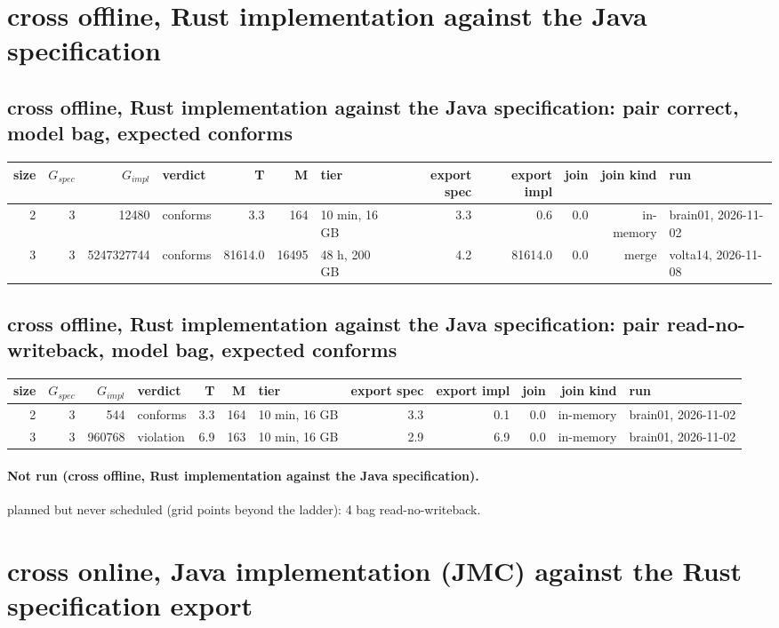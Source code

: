 \documentclass[10pt]{article}
\begin{document}
\section*{cross offline, Rust implementation against the Java specification}
\subsection*{cross offline, Rust implementation against the Java specification: pair \textsf{correct}, model bag, expected conforms}
\begin{longtable}{@{}rrrlrrlrrrrl@{}}
\toprule
size & $G_{\mathit{spec}}$ & $G_{\mathit{impl}}$ & verdict & T & M & tier & export spec & export impl & join & join kind & run \\
\midrule
\endhead
\color{red} 2 & 3 & 12480 & conforms & 3.3 & 164 & 10 min, 16 GB & 3.3 & 0.6 & 0.0 & in-memory & brain01, 2026-11-02 \\
\color{red} 3 & 3 & 5247327744 & conforms & 81614.0 & 16495 & 48 h, 200 GB & 4.2 & 81614.0 & 0.0 & merge & volta14, 2026-11-08 \\
\bottomrule
\end{longtable}
\subsection*{cross offline, Rust implementation against the Java specification: pair \textsf{read-no-writeback}, model bag, expected conforms}
\begin{longtable}{@{}rrrlrrlrrrrl@{}}
\toprule
size & $G_{\mathit{spec}}$ & $G_{\mathit{impl}}$ & verdict & T & M & tier & export spec & export impl & join & join kind & run \\
\midrule
\endhead
\color{red} 2 & 3 & 544 & conforms & 3.3 & 164 & 10 min, 16 GB & 3.3 & 0.1 & 0.0 & in-memory & brain01, 2026-11-02 \\
\color{red} 3 & 3 & 960768 & violation & 6.9 & 163 & 10 min, 16 GB & 2.9 & 6.9 & 0.0 & in-memory & brain01, 2026-11-02 \\
\bottomrule
\end{longtable}
\paragraph{Not run (cross offline, Rust implementation against the Java specification).}
planned but never scheduled (grid points beyond the ladder): 4 bag read-no-writeback.\par
\section*{cross online, Java implementation (JMC) against the Rust specification export}
\end{document}

